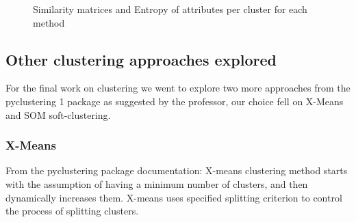 \begin{figure}[H]
    \caption{Similarity matrices and Entropy of attributes per cluster for each method}
    \label{fig:val_clusters}
\end{figure}

\subsection{Other clustering approaches explored}
For the final work on clustering we went to explore two more approaches from the pyclustering 1\cite{Novikov2019} package as suggested by the professor, our choice fell on X-Means and SOM soft-clustering.
\subsubsection{X-Means}
From the pyclustering package documentation: X-means clustering method starts with the assumption of having a minimum number of clusters, and then dynamically increases them. X-means uses specified splitting criterion to control the process of splitting clusters.
\vspace{3mm}

